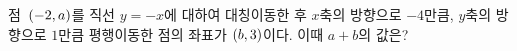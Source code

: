 점~$(-2{,}\mkern3mu\mathopen{}a)$를 직선 $y=-x$에 대하여 대칭이동한 후 $x$축의 방향으로 $-4$만큼, $y$축의 방향으로 $1$만큼 평행이동한 점의 좌표가 $(b{,}\mkern3mu\mathopen{}3)$이다. 이때 $a+b$의 값은?
